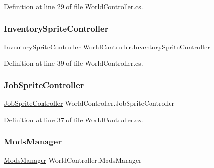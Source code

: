 Definition at line 29 of file World\+Controller.\+cs.

\mbox{\label{class_world_controller_a97eba6acd6f89973bbd072d65436c7d0}} 
\subsubsection{\texorpdfstring{Inventory\+Sprite\+Controller}{InventorySpriteController}}
{\footnotesize\ttfamily \hyperlink{class_inventory_sprite_controller}{Inventory\+Sprite\+Controller} World\+Controller.\+Inventory\+Sprite\+Controller\hspace{0.3cm}{\ttfamily [get]}}



Definition at line 39 of file World\+Controller.\+cs.

\mbox{\label{class_world_controller_a614511147eb8e2069dff19ac843a64a0}} 
\subsubsection{\texorpdfstring{Job\+Sprite\+Controller}{JobSpriteController}}
{\footnotesize\ttfamily \hyperlink{class_job_sprite_controller}{Job\+Sprite\+Controller} World\+Controller.\+Job\+Sprite\+Controller\hspace{0.3cm}{\ttfamily [get]}}



Definition at line 37 of file World\+Controller.\+cs.

\mbox{\label{class_world_controller_a8d7943508d1d026430d6e57a3fda805a}} 
\subsubsection{\texorpdfstring{Mods\+Manager}{ModsManager}}
{\footnotesize\ttfamily \hyperlink{class_mods_manager}{Mods\+Manager} World\+Controller.\+Mods\+Manager\hspace{0.3cm}{\ttfamily [get]}}



